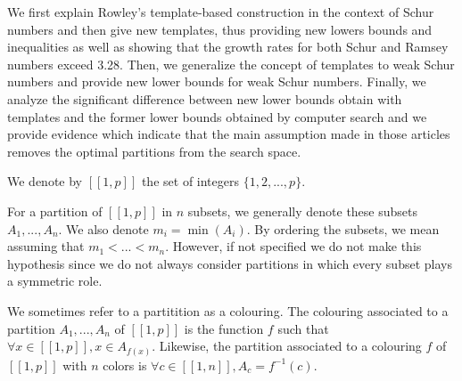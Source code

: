 \par We first explain Rowley's template-based construction in the context of Schur numbers and then give 
new templates, thus providing new lowers bounds and inequalities as well as showing that the growth rates 
for both Schur and Ramsey numbers exceed 3.28. Then, we generalize the concept of templates to weak Schur 
numbers and provide new lower bounds for weak Schur numbers. Finally, we analyze the significant difference 
between new lower bounds obtain with templates and the former lower bounds obtained by computer search 
and we provide evidence which indicate that the main assumption made in those articles removes the optimal 
partitions from the search space.

\begin{notation}
We denote by \([\![1,p]\!]\) the set of integers \(\{1, 2, ..., p\}\).
\end{notation}

\begin{notation}
For a partition of \([\![1, p]\!]\) in \(n\) subsets, we generally denote these subsets \(A_1, ..., A_n\). We 
also denote \(m_i = \min(A_i)\).
By ordering the subsets, we mean assuming that \(m_1 < ... < m_n\). However, if not specified we do not 
make this hypothesis since we do not always consider partitions in which every subset plays a symmetric role.
\end{notation}

\begin{definition}
We sometimes refer to a partitition as a colouring. The colouring associated to a partition \(A_1, ..., A_n\) of
\([\![1, p]\!]\) is the function \(f\) such that \(\forall x \in [\![1, p]\!], x \in A_{f(x)}\). Likewise, the partition 
associated to a colouring \(f\) of \([\![1, p]\!]\) with \(n\) colors is \(\forall c \in [\![1, n]\!], A_c = f^{-1}(c)\).
\end{definition}
